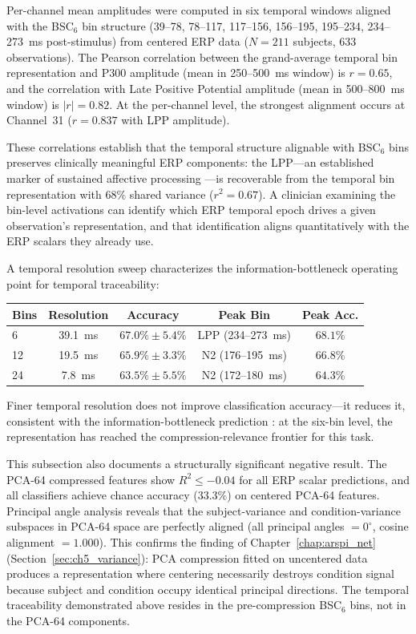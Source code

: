 Per-channel mean amplitudes were computed in six temporal windows aligned with the BSC$_6$ bin structure (39--78, 78--117, 117--156, 156--195, 195--234, 234--273~ms post-stimulus) from centered ERP data ($N = 211$ subjects, $633$ observations). The Pearson correlation between the grand-average temporal bin representation and P300 amplitude (mean in 250--500~ms window) is $r = 0.65$, and the correlation with Late Positive Potential amplitude (mean in 500--800~ms window) is $|r| = 0.82$. At the per-channel level, the strongest alignment occurs at Channel~31 ($r = 0.837$ with LPP amplitude).

These correlations establish that the temporal structure alignable with BSC$_6$ bins preserves clinically meaningful ERP components: the LPP---an established marker of sustained affective processing \cite{nelson_hajcak_2017}---is recoverable from the temporal bin representation with $68\%$ shared variance ($r^2 = 0.67$). A clinician examining the bin-level activations can identify which ERP temporal epoch drives a given observation's representation, and that identification aligns quantitatively with the ERP scalars they already use.

A temporal resolution sweep characterizes the information-bottleneck operating point for temporal traceability:
\begin{center}
\begin{tabular}{lcccc}
\toprule
\textbf{Bins} & \textbf{Resolution} & \textbf{Accuracy} & \textbf{Peak Bin} & \textbf{Peak Acc.} \\
\midrule
6  & 39.1~ms & $67.0\% \pm 5.4\%$ & LPP (234--273~ms) & $68.1\%$ \\
12 & 19.5~ms & $65.9\% \pm 3.3\%$ & N2 (176--195~ms)  & $66.8\%$ \\
24 & 7.8~ms  & $63.5\% \pm 5.5\%$ & N2 (172--180~ms)  & $64.3\%$ \\
\bottomrule
\end{tabular}
\end{center}
Finer temporal resolution does not improve classification accuracy---it reduces it, consistent with the information-bottleneck prediction \cite{tishby_deep_2015}: at the six-bin level, the representation has reached the compression-relevance frontier for this task.

This subsection also documents a structurally significant negative result. The PCA-64 compressed features show $R^2 \leq -0.04$ for all ERP scalar predictions, and all classifiers achieve chance accuracy ($33.3\%$) on centered PCA-64 features. Principal angle analysis reveals that the subject-variance and condition-variance subspaces in PCA-64 space are perfectly aligned (all principal angles $= 0^\circ$, cosine alignment $= 1.000$). This confirms the finding of Chapter~\ref{chap:arspi_net} (Section~\ref{sec:ch5_variance}): PCA compression fitted on uncentered data produces a representation where centering necessarily destroys condition signal because subject and condition occupy identical principal directions. The temporal traceability demonstrated above resides in the pre-compression BSC$_6$ bins, not in the PCA-64 components.

